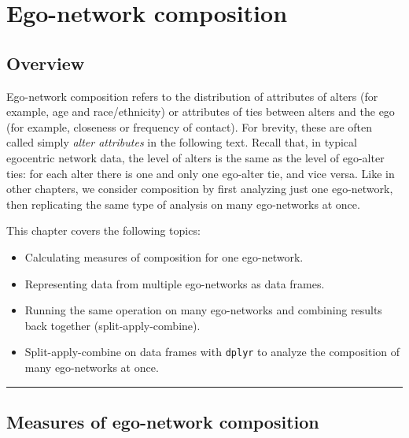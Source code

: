 \documentclass[
]{book}
\providecommand{\tightlist}{%
  \setlength{\itemsep}{0pt}\setlength{\parskip}{0pt}}
\begin{document}
\hypertarget{composition}{%
\chapter{Ego-network composition}\label{composition}}

\hypertarget{overview-2}{%
\section{Overview}\label{overview-2}}

Ego-network composition refers to the distribution of attributes of alters (for example, age and race/ethnicity) or attributes of ties between alters and the ego (for example, closeness or frequency of contact). For brevity, these are often called simply \emph{alter attributes} in the following text. Recall that, in typical egocentric network data, the level of alters is the same as the level of ego-alter ties: for each alter there is one and only one ego-alter tie, and vice versa. Like in other chapters, we consider composition by first analyzing just one ego-network, then replicating the same type of analysis on many ego-networks at once.

This chapter covers the following topics:

\begin{itemize}
\tightlist
\item
  Calculating measures of composition for one ego-network.
\item
  Representing data from multiple ego-networks as data frames.
\item
  Running the same operation on many ego-networks and combining results back together (split-apply-combine).
\item
  Split-apply-combine on data frames with \texttt{dplyr} to analyze the composition of many ego-networks at once.
\end{itemize}

\begin{center}\rule{0.5\linewidth}{0.5pt}\end{center}

\hypertarget{measures-of-ego-network-composition}{%
\section{Measures of ego-network composition}\label{measures-of-ego-network-composition}}
\end{document}
